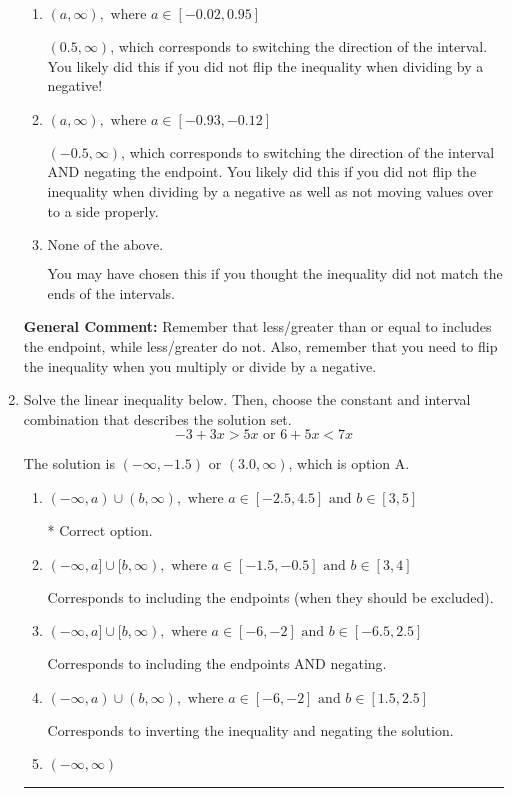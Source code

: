 \documentclass{extbook}[14pt]
\newcommand{\litem}[1]{\item #1

\rule{\textwidth}{0.4pt}}
\begin{document}
\begin{enumerate}
{\begin{enumerate}[label=\Alph*.]
 $(-\infty, -0.5)$, which corresponds to negating the endpoint of the solution.
\item \( (a, \infty), \text{ where } a \in [-0.02, 0.95] \)

 $(0.5, \infty)$, which corresponds to switching the direction of the interval. You likely did this if you did not flip the inequality when dividing by a negative!
\item \( (a, \infty), \text{ where } a \in [-0.93, -0.12] \)

 $(-0.5, \infty)$, which corresponds to switching the direction of the interval AND negating the endpoint. You likely did this if you did not flip the inequality when dividing by a negative as well as not moving values over to a side properly.
\item \( \text{None of the above}. \)

You may have chosen this if you thought the inequality did not match the ends of the intervals.
\end{enumerate}

\textbf{General Comment:} Remember that less/greater than or equal to includes the endpoint, while less/greater do not. Also, remember that you need to flip the inequality when you multiply or divide by a negative.
}
\litem{
Solve the linear inequality below. Then, choose the constant and interval combination that describes the solution set.
\[ -3 + 3 x > 5 x \text{ or } 6 + 5 x < 7 x \]

The solution is \( (-\infty, -1.5) \text{ or } (3.0, \infty) \), which is option A.\begin{enumerate}[label=\Alph*.]
\item \( (-\infty, a) \cup (b, \infty), \text{ where } a \in [-2.5, 4.5] \text{ and } b \in [3, 5] \)

 * Correct option.
\item \( (-\infty, a] \cup [b, \infty), \text{ where } a \in [-1.5, -0.5] \text{ and } b \in [3, 4] \)

Corresponds to including the endpoints (when they should be excluded).
\item \( (-\infty, a] \cup [b, \infty), \text{ where } a \in [-6, -2] \text{ and } b \in [-6.5, 2.5] \)

Corresponds to including the endpoints AND negating.
\item \( (-\infty, a) \cup (b, \infty), \text{ where } a \in [-6, -2] \text{ and } b \in [1.5, 2.5] \)

Corresponds to inverting the inequality and negating the solution.
\item \( (-\infty, \infty) \)


\end{enumerate}}
\end{enumerate}
\end{document}
